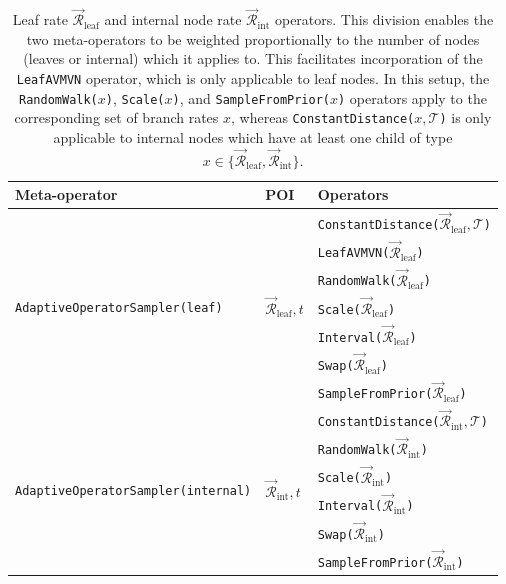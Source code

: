 \documentclass[10pt,letterpaper]{article}
\begin{document}
\begin{table}[h!]
\centering
\begin{tabular}{l l l} 
 Meta-operator & POI & Operators \\
\hline
 \multirow{7}{*}{\texttt{AdaptiveOperatorSampler(leaf)}} & \multirow{7}{*}{$\vec{\mathcal{R}}^{\,}_\text{leaf}, t$} & \texttt{ConstantDistance($\vec{\mathcal{R}}^{\,}_\text{leaf}, \mathcal{T}$)}   \\ 
&& \texttt{LeafAVMVN($\vec{\mathcal{R}}^{\,}_\text{leaf}$)}  \\
&& \texttt{RandomWalk($\vec{\mathcal{R}}^{\,}_\text{leaf}$)}  \\
&& \texttt{Scale($\vec{\mathcal{R}}^{\,}_\text{leaf}$)}   \\
&& \texttt{Interval($\vec{\mathcal{R}}^{\,}_\text{leaf}$)}   \\
&& \texttt{Swap($\vec{\mathcal{R}}^{\,}_\text{leaf}$)}  \\
&& \texttt{SampleFromPrior($\vec{\mathcal{R}}^{\,}_\text{leaf}$)} \\
\hline
 \multirow{6}{*}{\texttt{AdaptiveOperatorSampler(internal)}} & \multirow{6}{*}{$\vec{\mathcal{R}}^{\,}_\text{int}, t$} & \texttt{ConstantDistance($\vec{\mathcal{R}}^{\,}_\text{int}, \mathcal{T}$)}   \\ 
&& \texttt{RandomWalk($\vec{\mathcal{R}}^{\,}_\text{int}$)}  \\
&& \texttt{Scale($\vec{\mathcal{R}}^{\,}_\text{int}$)}   \\
&& \texttt{Interval($\vec{\mathcal{R}}^{\,}_\text{int}$)}   \\
&& \texttt{Swap($\vec{\mathcal{R}}^{\,}_\text{int}$)}  \\
&& \texttt{SampleFromPrior($\vec{\mathcal{R}}^{\,}_\text{int}$)} \\
\end{tabular}
\caption{Leaf rate $\vec{\mathcal{R}}^{\,}_\text{leaf}$ and internal node rate $\vec{\mathcal{R}}^{\,}_\text{int}$ operators. 
This division enables the two meta-operators to be weighted proportionally to the number of nodes (leaves or internal) which it applies to.
This facilitates incorporation of the  \texttt{LeafAVMVN} operator, which is only applicable to leaf nodes.
In this setup, the \texttt{RandomWalk($x$)}, \texttt{Scale($x$)}, and \texttt{SampleFromPrior($x$)} operators apply to the corresponding set of branch rates $x$, whereas \texttt{ConstantDistance($x, \mathcal{T}$)} is only applicable to internal nodes which have at least one child of type $x \in \{\vec{\mathcal{R}}^{\,}_\text{leaf}, \vec{\mathcal{R}}^{\,}_\text{int}\}$.}
\label{table:AVMVNoperators}
\end{table}
\end{document}
